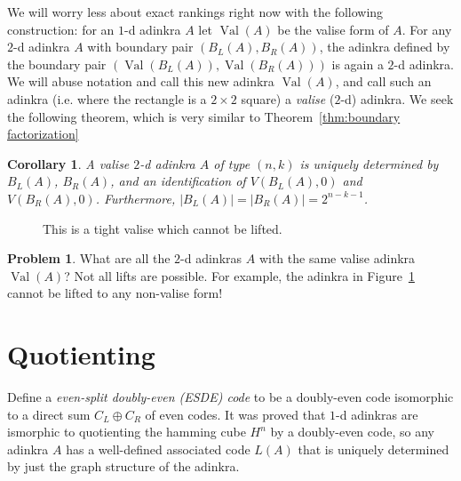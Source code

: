 \documentclass[12pt,twoside,singlespace]{article}
\numberwithin{equation}{section}
\newtheorem{cor}[equation]{Corollary}
\theoremstyle{definition}
\newtheorem{prob}{Problem}
\newcommand{\on}{\operatorname}
\newcommand{\val}{\on{Val}}
\begin{document}
We will worry less about exact rankings right now with the following construction: for an $1$-d adinkra $A$ let $\val(A)$ be the valise form of $A$. For any $2$-d adinkra $A$ with boundary pair $(B_L(A), B_R(A))$, the adinkra defined by the boundary pair $(\val(B_L(A)), \val(B_R(A)))$ is again a $2$-d adinkra. We will abuse notation and call this new adinkra $\val(A)$, and call such an adinkra (i.e. where the rectangle is a $2 \times 2$ square) a \emph{valise} ($2$-d) adinkra. We seek the following theorem, which is very similar to Theorem~\ref{thm:boundary factorization}

\begin{cor}
\label{cor:valise factorization}
A valise $2$-d adinkra $A$ of type $(n,k)$ is uniquely determined by $B_L(A)$, $B_R(A)$, and an identification of $V(B_L(A), 0)$ and $V(B_R(A), 0)$. Furthermore, $|B_L(A)| = |B_R(A)| = 2^{n-k-1}$.
\end{cor}



\begin{figure}[htb]
\begin{center}

\caption{This is a tight valise which cannot be lifted.\label{fig:tight valise}}
\end{center}
\end{figure}

\begin{prob}
What are all the $2$-d adinkras $A$ with the same valise adinkra $\val(A)$? Not all lifts are possible. For example, the adinkra in Figure~\ref{fig:tight valise} cannot be lifted to any non-valise form!
\end{prob}

\section{Quotienting}



Define a \emph{even-split doubly-even (ESDE) code} to be a doubly-even code isomorphic to a direct sum $C_L \oplus C_R$ of even codes. It was proved \cite{blah} that $1$-d adinkras are ismorphic to quotienting the hamming cube $H^n$ by a doubly-even code, so any adinkra $A$ has a well-defined associated code $L(A)$ that is uniquely determined by just the graph structure of the adinkra.
\end{document}
